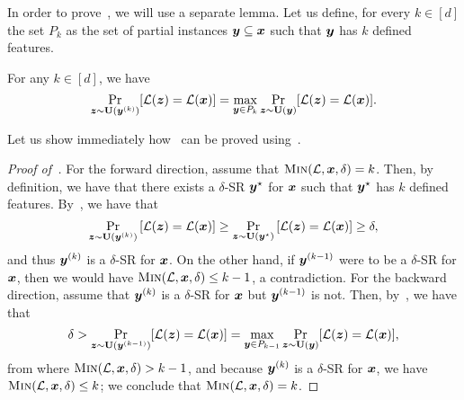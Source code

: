 In order to prove~, we will use a separate lemma. Let us define, for every $k \in [d]$ the set $P_k$ as the set of partial instances ${\bm{y}} \subseteq {\bm{x}}$ such that ${\bm{y}}$ has $k$ defined features.
\begin{lemma}\label{lemma:greedy-3}
    For any $k \in [d]$, we have 
    \[
        \Pr_{{\bm{z}} \sim \mathbf{U}({\bm{y}}^{(k)})}[\mathcal{L}({\bm{z}}) = \mathcal{L}({\bm{x}})] = \max_{{\bm{y}} \in P_k} \Pr_{{\bm{z}} \sim \mathbf{U}({\bm{y}})}[\mathcal{L}({\bm{z}}) = \mathcal{L}({\bm{x}})].
    \]
\end{lemma}

Let us show immediately how~ can be proved using~.
\begin{proof}[Proof of~]
  For the forward direction, assume that $\operatorname{\textsc{Min}}(\mathcal{L}, {\bm{x}}, \delta) = k$. Then, by definition, we have that there exists a $\delta$-SR ${\bm{y}}^\star$ for ${\bm{x}}$ such that ${\bm{y}}^\star$ has $k$ defined features.
    By~, we have that 
    \[ 
        \Pr_{{\bm{z}} \sim \mathbf{U}({\bm{y}}^{(k)})}\left[\mathcal{L}({\bm{z}}) = \mathcal{L}({\bm{x}})\right] \geq \Pr_{{\bm{z}} \sim \mathbf{U}({\bm{y}}^\star)}\left[\mathcal{L}({\bm{z}}) = \mathcal{L}({\bm{x}})\right] \geq \delta,
    \]
    and thus ${\bm{y}}^{(k)}$ is a $\delta$-SR for ${\bm{x}}$. On the other hand, if ${\bm{y}}^{(k-1)}$ were to be a $\delta$-SR for ${\bm{x}}$, then we would have $\operatorname{\textsc{Min}}(\mathcal{L}, {\bm{x}}, \delta) \leq k-1$, a contradiction.
    For the backward direction, assume that ${\bm{y}}^{(k)}$ is a $\delta$-SR for ${\bm{x}}$ but ${\bm{y}}^{(k-1)}$ is not. Then, by~, we have that 
    \[
        \delta > \Pr_{{\bm{z}} \sim \mathbf{U}({\bm{y}}^{(k-1)})}[\mathcal{L}({\bm{z}}) = \mathcal{L}({\bm{x}})] = \max_{{\bm{y}} \in P_{k-1}} \Pr_{{\bm{z}} \sim \mathbf{U}({\bm{y}})}[\mathcal{L}({\bm{z}}) = \mathcal{L}({\bm{x}})],
    \]
    from where $\operatorname{\textsc{Min}}(\mathcal{L}, {\bm{x}}, \delta) > k-1$, and because ${\bm{y}}^{(k)}$ is a $\delta$-SR for ${\bm{x}}$, we have $\operatorname{\textsc{Min}}(\mathcal{L}, {\bm{x}}, \delta) \leq k$; we conclude that $\operatorname{\textsc{Min}}(\mathcal{L}, {\bm{x}}, \delta) = k$.
\end{proof}

